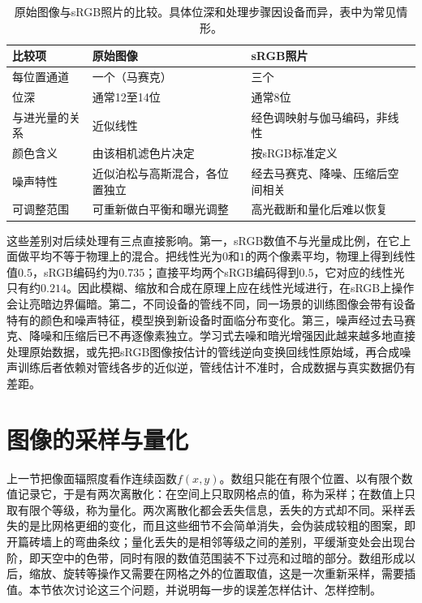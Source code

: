 \begin{table}[htbp]
  \centering
  \small
  \begin{tabularx}{\linewidth}{@{}p{22mm}XX@{}}
    \toprule
    比较项 & 原始图像 & sRGB照片\\
    \midrule
    每位置通道 & 一个（马赛克） & 三个\\
    位深 & 通常12至14位 & 通常8位\\
    与进光量的关系 & 近似线性 & 经色调映射与伽马编码，非线性\\
    颜色含义 & 由该相机滤色片决定 & 按sRGB标准定义\\
    噪声特性 & 近似泊松与高斯混合，各位置独立 & 经去马赛克、降噪、压缩后空间相关\\
    可调整范围 & 可重新做白平衡和曝光调整 & 高光截断和量化后难以恢复\\
    \bottomrule
  \end{tabularx}
  \caption{原始图像与sRGB照片的比较。具体位深和处理步骤因设备而异，表中为常见情形。}
  \label{tab:vision-formation-raw-srgb}
\end{table}

这些差别对后续处理有三点直接影响。第一，sRGB数值不与光量成比例，在它上面做平均不等于物理上的混合。把线性光为$0$和$1$的两个像素平均，物理上得到线性值$0.5$，sRGB编码约为$0.735$；直接平均两个sRGB编码得到$0.5$，它对应的线性光只有约$0.214$。因此模糊、缩放和合成在原理上应在线性光域进行，在sRGB上操作会让亮暗边界偏暗。第二，不同设备的管线不同，同一场景的训练图像会带有设备特有的颜色和噪声特征，模型换到新设备时面临分布变化。第三，噪声经过去马赛克、降噪和压缩后已不再逐像素独立。学习式去噪和暗光增强因此越来越多地直接处理原始数据，或先把sRGB图像按估计的管线逆向变换回线性原始域，再合成噪声训练后者依赖对管线各步的近似逆，管线估计不准时，合成数据与真实数据仍有差距。

\section{图像的采样与量化}
\label{sec:vision-formation-sampling}

上一节把像面辐照度看作连续函数$f(x,y)$。数组只能在有限个位置、以有限个数值记录它，于是有两次离散化：在空间上只取网格点的值，称为采样；在数值上只取有限个等级，称为量化。两次离散化都会丢失信息，丢失的方式却不同。采样丢失的是比网格更细的变化，而且这些细节不会简单消失，会伪装成较粗的图案，即开篇砖墙上的弯曲条纹；量化丢失的是相邻等级之间的差别，平缓渐变处会出现台阶，即天空中的色带，同时有限的数值范围装不下过亮和过暗的部分。数组形成以后，缩放、旋转等操作又需要在网格之外的位置取值，这是一次重新采样，需要插值。本节依次讨论这三个问题，并说明每一步的误差怎样估计、怎样控制。


